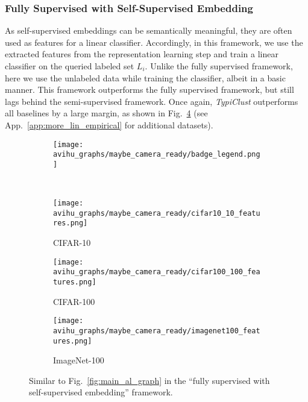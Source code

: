 \documentclass{article}
\newcommand{\app}{App.}
\begin{document}
\subsubsection{Fully Supervised with Self-Supervised Embedding} 
\label{sec:fwork:(ii)}
As self-supervised embeddings can be semantically meaningful, they are often used as features for a linear classifier. Accordingly, in this framework, we use the extracted features from the representation learning step and train a linear classifier on the queried labeled set $L_i$. Unlike the fully supervised framework, here we use the unlabeled data while training the classifier, albeit in a basic manner. This framework outperforms the fully supervised framework, but still lags behind the semi-supervised framework. Once again, \textit{TypiClust} outperforms all baselines by a large margin, as shown in Fig.~\ref{fig:weak_semi} (see \app~\ref{app:more_lin_empirical} for additional datasets). 



\begin{figure}[htb!]
\begin{center}
\begin{subfigure}{.45\textwidth}
  \centering
 \texttt{[image: avihu\_graphs/maybe\_camera\_ready/badge\_legend.png]}
\end{subfigure}
\\
\begin{subfigure}{.157\textwidth}
      \centering
      \texttt{[image: avihu\_graphs/maybe\_camera\_ready/cifar10\_10\_features.png]}
    \vspace{-0.5cm}
    \caption{CIFAR-10}
    \label{fig:weak_semi_cifar10}
    \end{subfigure}
    \begin{subfigure}{.157\textwidth}
      \centering
      \texttt{[image: avihu\_graphs/maybe\_camera\_ready/cifar100\_100\_features.png]}
    \vspace{-0.5cm}
    \caption{CIFAR-100}
    \label{fig:weak_semi_cifar100}
    \end{subfigure}
    \begin{subfigure}{.157\textwidth}
      \centering
      \texttt{[image: avihu\_graphs/maybe\_camera\_ready/imagenet100\_features.png]}
    \vspace{-0.5cm}
    \caption{ImageNet-100}
    \label{fig:weak_semi_imagenet200}
    \end{subfigure}
    \vspace{-0.35cm}
\caption{Similar to Fig.~\ref{fig:main_al_graph} in the ``fully supervised with self-supervised embedding'' framework.}
\label{fig:weak_semi}
\end{center}
\vspace{-.3cm}
\end{figure}
\end{document}
